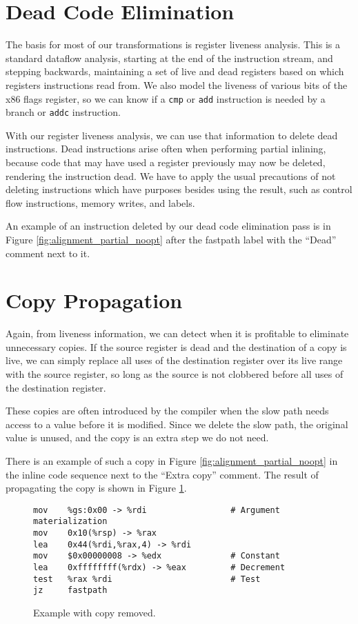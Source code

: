 \section{Dead Code Elimination}

The basis for most of our transformations is register liveness analysis.  This
is a standard dataflow analysis, starting at the end of the instruction stream,
and stepping backwards, maintaining a set of live and dead registers based on
which registers instructions read from.  We also model the liveness of various
bits of the x86 flags register, so we can know if a {\tt cmp} or {\tt add}
instruction is needed by a branch or {\tt addc} instruction.

With our register liveness analysis, we can use that information to delete dead
instructions.  Dead instructions arise often when performing partial inlining,
because code that may have used a register previously may now be deleted,
rendering the instruction dead.  We have to apply the usual precautions of not
deleting instructions which have purposes besides using the result, such as
control flow instructions, memory writes, and labels.

An example of an instruction deleted by our dead code elimination pass is in
Figure \ref{fig:alignment_partial_noopt} after the fastpath label with the ``Dead''
comment next to it.

\section{Copy Propagation}

Again, from liveness information, we can detect when it is profitable to
eliminate unnecessary copies.  If the source register is dead and the
destination of a copy is live, we can simply replace all uses of the destination
register over its live range with the source register, so long as the source is
not clobbered before all uses of the destination register.

These copies are often introduced by the compiler when the slow path needs
access to a value before it is modified.  Since we delete the slow path, the
original value is unused, and the copy is an extra step we do not need.

There is an example of such a copy in Figure \ref{fig:alignment_partial_noopt}
in the inline code sequence next to the ``Extra copy'' comment.  The result of
propagating the copy is shown in Figure \ref{fig:copy_propagation}.

\begin{figure}
\begin{verbatim}
mov    %gs:0x00 -> %rdi                 # Argument materialization
mov    0x10(%rsp) -> %rax
lea    0x44(%rdi,%rax,4) -> %rdi
mov    $0x00000008 -> %edx              # Constant
lea    0xffffffff(%rdx) -> %eax         # Decrement
test   %rax %rdi                        # Test
jz     fastpath
\end{verbatim}
\caption{Example with copy removed.}
\label{fig:copy_propagation}
\end{figure}

